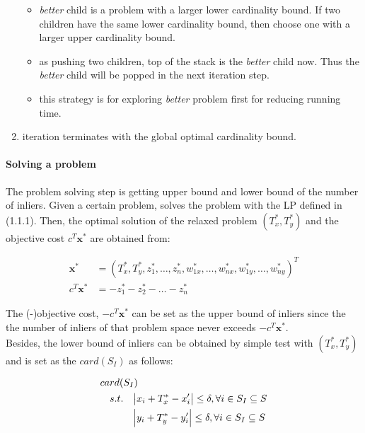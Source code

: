 \documentclass[paper=a4, fontsize=11pt]{scrartcl} %
\numberwithin{equation}{section} %
\numberwithin{figure}{section} %
\numberwithin{table}{section} %
\renewcommand{\vec}[1]{\mathbf{#1}}
\begin{document}
\begin{enumerate}
	\begin{itemize}
	\item \textit{better} child is a problem with a larger lower cardinality bound. If two children have the same lower cardinality bound, then choose one with a larger upper cardinality bound.
	\item as pushing two children, top of the stack is the \textit{better} child now. Thus the \textit{better} child will be popped in the next iteration step. 
	\item this strategy is for exploring \textit{better} problem first for reducing running time. 
	\end{itemize}
\item iteration terminates with the global optimal cardinality bound. 
\end{enumerate}

\paragraph{Solving a problem} The problem solving step is getting upper bound and lower bound of the number of inliers. Given a certain problem, solves the problem with the LP defined in (1.1.1). Then, the optimal solution of the relaxed problem $(T_{x}^*, T_{y}^*)$ and the objective cost $c^{T}\vec{x}^*$ are obtained from:

\begin{align}
\vec{x}^* &= (T_{x}^*, T_{y}^*, z_{1}^*, \dots, z_{n}^*, w_{1x}^*, \dots, w_{nx}^*, w_{1y}^*, \dots, w_{ny}^*)^{T} \\
c^{T} \vec{x}^* &= - z_{1}^* - z_{2}^* - \dots - z_{n}^*
\end{align}

The (-)objective cost, $-c^{T}\vec{x}^*$ can be set as the upper bound of inliers since the the number of inliers of that problem space never exceeds  $-c^{T}\vec{x}^*$. \\

Besides, the lower bound of inliers can be obtained by simple test with $(T_{x}^*, T_{y}^*)$ and is set as the $card(S_{I})$ as follows:

\begin{equation}
\begin{split}
card(&S_{I})  \\
s.t. 	&\quad \abs{x_{i} + T_{x}^* - x_{i}'} \leq \delta, \forall i \in S_{I} \subseteq S \\
	&\quad \abs{y_{i} + T_{y}^* - y_{i}'} \leq \delta, \forall i \in S_{I} \subseteq S
\end{split}
\end{equation}
\end{document}
